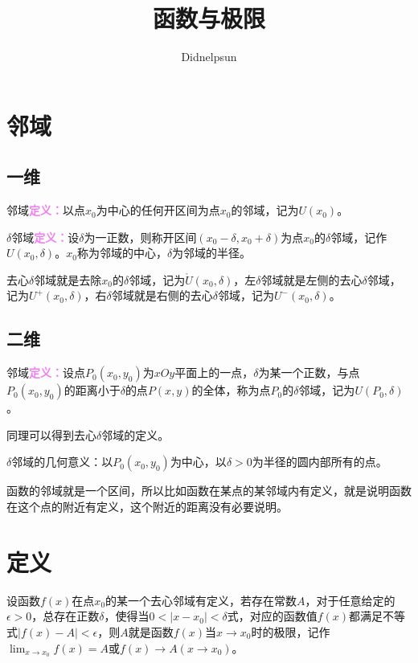 \documentclass[UTF8]{ctexart}
\author{Didnelpsun}
\title{函数与极限}
\date{}
\begin{document}
\maketitle
\thispagestyle{empty}
\tableofcontents
\thispagestyle{empty}
\newpage
\pagestyle{plain}
\setcounter{page}{1}
\section{邻域}
\subsection{一维}

邻域\textcolor{violet}{\textbf{定义：}}以点$x_0$为中心的任何开区间为点$x_0$的邻域，记为$U(x_0)$。

$\delta$邻域\textcolor{violet}{\textbf{定义：}}设$\delta$为一正数，则称开区间$(x_0-\delta,x_0+\delta)$为点$x_0$的$\delta$邻域，记作$U(x_0,\delta)$。$x_0$称为邻域的中心，$\delta$为邻域的半径。

去心$\delta$邻域就是去除$x_0$的$\delta$邻域，记为$\mathring{U}(x_0,\delta)$，左$\delta$邻域就是左侧的去心$\delta$邻域，记为$U^+(x_0,\delta)$，右$\delta$邻域就是右侧的去心$\delta$邻域，记为$U^-(x_0,\delta)$。

\subsection{二维}

邻域\textcolor{violet}{\textbf{定义：}}设点$P_0(x_0,y_0)$为$xOy$平面上的一点，$\delta$为某一个正数，与点$P_0(x_0,y_0)$的距离小于$\delta$的点$P(x,y)$的全体，称为点$P_0$的$\delta$邻域，记为$U(P_0,\delta)$。

同理可以得到去心$\delta$邻域的定义。

$\delta$邻域的几何意义：以$P_0(x_0,y_0)$为中心，以$\delta>0$为半径的圆内部所有的点。

函数的邻域就是一个区间，所以比如函数在某点的某邻域内有定义，就是说明函数在这个点的附近有定义，这个附近的距离没有必要说明。

\section{定义}

设函数$f(x)$在点$x_0$的某一个去心邻域有定义，若存在常数$A$，对于任意给定的$\epsilon>0$，总存在正数$\delta$，使得当$0<\vert x-x_0\vert<\delta$式，对应的函数值$f(x)$都满足不等式$\vert f(x)-A\vert <\epsilon$，则$A$就是函数$f(x)$当$x\to x_0$时的极限，记作$\lim_{x\to x_0}f(x)=A$或$f(x)\rightarrow A(x\rightarrow x_0)$。
\end{document}
